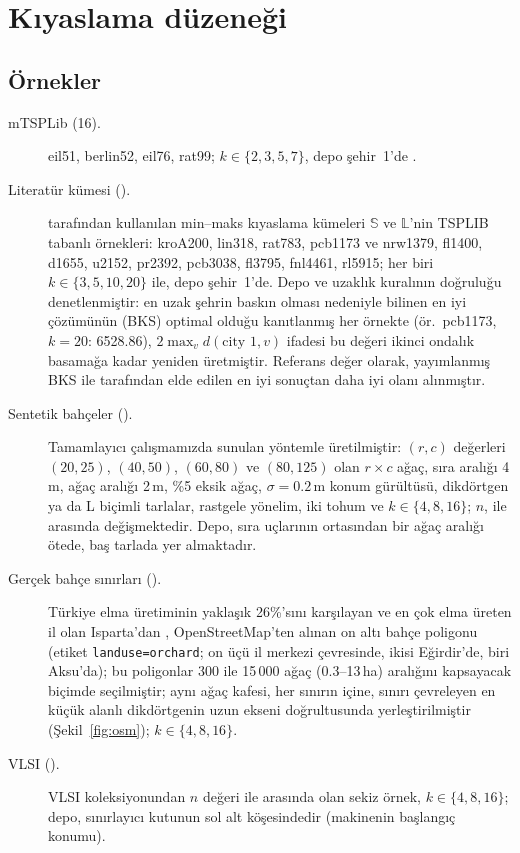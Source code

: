 \section{Kıyaslama düzeneği}\label{sec:setup}

\subsection{Örnekler}
\begin{description}
\item[mTSPLib (16).] eil51, berlin52, eil76, rat99; $k\in\{2,3,5,7\}$, depo
şehir~1'de \citep{necula2015}.
\item[Literatür kümesi (\LitCount).] \citet{hehao2023,hehaoxia2024} tarafından kullanılan
min--maks kıyaslama kümeleri $\mathbb{S}$ ve $\mathbb{L}$'nin TSPLIB tabanlı örnekleri:
kroA200, lin318, rat783, pcb1173 ve nrw1379, fl1400, d1655, u2152, pr2392,
pcb3038, fl3795, fnl4461, rl5915; her biri $k\in\{3,5,10,20\}$ ile, depo
şehir~1'de. Depo ve uzaklık kuralının doğruluğu denetlenmiştir: en uzak şehrin baskın olması nedeniyle
bilinen en iyi çözümünün (BKS) optimal olduğu kanıtlanmış her örnekte
(ör.\ pcb1173, $k=20$: 6528.86), $2\max_v d(\text{city }1,v)$ ifadesi bu değeri
ikinci ondalık basamağa kadar yeniden üretmiştir. Referans değer olarak, yayımlanmış BKS ile
\citet{hehaoxia2024} tarafından elde edilen en iyi sonuçtan daha iyi olanı alınmıştır.
\item[Sentetik bahçeler (\OrchCount).] Tamamlayıcı çalışmamızda \citep{asil2026frame} sunulan yöntemle üretilmiştir:
$(r,c)$ değerleri $(20,25)$, $(40,50)$, $(60,80)$ ve
$(80,125)$ olan $r\times c$ ağaç, sıra aralığı
4\,m, ağaç aralığı 2\,m, \%5 eksik ağaç, $\sigma=0.2$\,m konum gürültüsü,
dikdörtgen ya da L biçimli tarlalar, rastgele yönelim, iki tohum ve
$k\in\{4,8,16\}$; $n$, \OrchNmin{} ile \OrchNmax{} arasında değişmektedir. Depo,
sıra uçlarının ortasından bir ağaç aralığı ötede, baş tarlada yer almaktadır.
\item[Gerçek bahçe sınırları (\OsmCount).] Türkiye elma üretiminin yaklaşık 26\%'sını karşılayan ve en çok elma üreten il olan
Isparta'dan \citep{usda_2025_gain}, OpenStreetMap'ten alınan on altı bahçe poligonu
(etiket \texttt{landuse}\allowbreak\texttt{=orchard}; on üçü il merkezi çevresinde, ikisi Eğirdir'de, biri Aksu'da);
bu poligonlar 300 ile 15\,000 ağaç (0.3--13\,ha) aralığını kapsayacak biçimde seçilmiştir;
aynı ağaç kafesi, her sınırın içine, sınırı çevreleyen en küçük alanlı dikdörtgenin uzun ekseni
doğrultusunda yerleştirilmiştir (Şekil~\ref{fig:osm}); $k\in\{4,8,16\}$.
\item[VLSI (\VlsiCount).] VLSI koleksiyonundan $n$ değeri
\VlsiNmin{} ile \VlsiNmax{} arasında olan sekiz örnek, $k\in\{4,8,16\}$; depo,
sınırlayıcı kutunun sol alt köşesindedir (makinenin başlangıç konumu).
\end{description}

